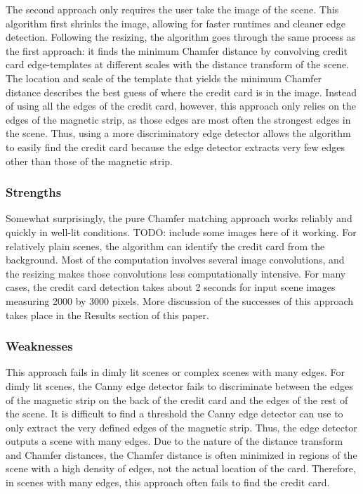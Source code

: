 \documentclass[10pt,twocolumn,letterpaper]{article}
\begin{document}
The second approach only requires the user take the image of the scene. This algorithm first shrinks the image, allowing for faster runtimes and cleaner edge detection. Following the resizing, the algorithm goes through the same process as the first approach: it finds the minimum Chamfer distance by convolving credit card edge-templates at different scales with the distance transform of the scene. The location and scale of the template that yields the minimum Chamfer distance describes the best guess of where the credit card is in the image. 
	Instead of using all the edges of the credit card, however, this approach only relies on the edges of the magnetic strip, as those edges are most often the strongest edges in the scene. Thus, using a more discriminatory edge detector allows the algorithm to easily find the credit card because the edge detector extracts very few edges other than those of the magnetic strip.

\subsubsection{Strengths}

	Somewhat surprisingly, the pure Chamfer matching approach works reliably and quickly in well-lit conditions. TODO: include some images here of it working. For relatively plain scenes, the algorithm can identify the credit card from the background. Most of the computation involves several image convolutions, and the resizing makes those convolutions less computationally intensive. For many cases, the credit card detection takes about 2 seconds for input scene images measuring 2000 by 3000 pixels. More discussion of the successes of this approach takes place in the Results section of this paper.
\subsubsection{Weaknesses}

	This approach fails in dimly lit scenes or complex scenes with many edges. For dimly lit scenes, the Canny edge detector fails to discriminate between the edges of the magnetic strip on the back of the credit card and the edges of the rest of the scene. It is difficult to find a threshold the Canny edge detector can use to only extract the very defined edges of the magnetic strip. Thus, the edge detector outputs a scene with many edges. Due to the nature of the distance transform and Chamfer distances, the Chamfer distance is often minimized in regions of the scene with a high density of edges, not the actual location of the card. Therefore, in scenes with many edges, this approach often fails to find the credit card.
	
\end{document}
